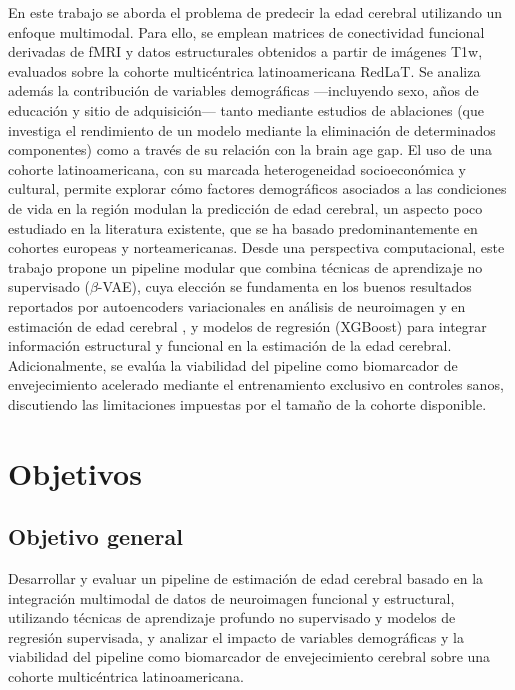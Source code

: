 En este trabajo se aborda el problema de predecir la edad cerebral utilizando un enfoque multimodal. Para ello, se emplean matrices de conectividad funcional derivadas de fMRI y datos estructurales obtenidos a partir de imágenes T1w, evaluados sobre la cohorte multicéntrica latinoamericana RedLaT. Se analiza además la contribución de variables demográficas ---incluyendo sexo, años de educación y sitio de adquisición--- tanto mediante estudios de ablaciones (que investiga el rendimiento de un modelo mediante la eliminación de determinados componentes) como a través de su relación con la brain age gap. El uso de una cohorte latinoamericana, con su marcada heterogeneidad socioeconómica y cultural, permite explorar cómo factores demográficos asociados a las condiciones de vida en la región modulan la predicción de edad cerebral, un aspecto poco estudiado en la literatura existente, que se ha basado predominantemente en cohortes europeas y norteamericanas. Desde una perspectiva computacional, este trabajo propone un pipeline modular que combina técnicas de aprendizaje no supervisado ($\beta$-VAE), cuya elección se fundamenta en los buenos resultados reportados por autoencoders variacionales en análisis de neuroimagen \cite{vieira2017using} y en estimación de edad cerebral \cite{dufumier2024multi}, y modelos de regresión (XGBoost) para integrar información estructural y funcional en la estimación de la edad cerebral. Adicionalmente, se evalúa la viabilidad del pipeline como biomarcador de envejecimiento acelerado mediante el entrenamiento exclusivo en controles sanos, discutiendo las limitaciones impuestas por el tamaño de la cohorte disponible.


\section{Objetivos}

\subsection{Objetivo general}

Desarrollar y evaluar un pipeline de estimación de edad cerebral basado en la integración multimodal de datos de neuroimagen funcional y estructural, utilizando técnicas de aprendizaje profundo no supervisado y modelos de regresión supervisada, y analizar el impacto de variables demográficas y la viabilidad del pipeline como biomarcador de envejecimiento cerebral sobre una cohorte multicéntrica latinoamericana.

